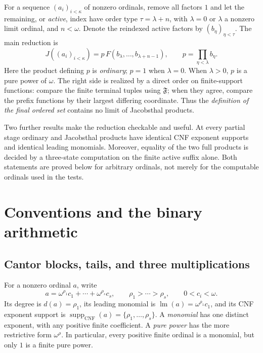 \documentclass[11pt,letterpaper]{article}
\theoremstyle{definition}
\theoremstyle{remark}
\newcommand{\FF}{\mathfrak F}
\newcommand{\CNF}{\operatorname{CNF}}
\newcommand{\supp}{\operatorname{supp}}
\newcommand{\lead}{\operatorname{lm}}
\begin{document}
For a sequence $(a_i)_{i<\kappa}$ of nonzero ordinals, remove all factors
$1$ and let the remaining, or \emph{active}, index have order type
$\tau=\lambda+n$, with $\lambda=0$ or $\lambda$ a nonzero limit ordinal,
and $n<\omega$. Denote the reindexed active factors by $(b_\eta)_{\eta<\tau}$.
The main reduction is
\begin{equation}\label{eq:intro-reduction}
 \boxed{\quad
 J((a_i)_{i<\kappa})
   =p\,F(b_\lambda,\ldots,b_{\lambda+n-1}),\qquad
 p=\prod_{\eta<\lambda}b_\eta .\quad}
\end{equation}
Here the product defining $p$ is \emph{ordinary}; $p=1$ when $\lambda=0$.
When $\lambda>0$, $p$ is a pure power of $\omega$.
The right side is realized by a direct order on finite-support functions:
compare the finite terminal tuples using $\FF$; when they agree, compare
the prefix functions by their largest differing coordinate. Thus the
\emph{definition of the final ordered set} contains no limit of Jacobsthal
products.

Two further results make the reduction checkable and useful. At every
partial stage ordinary and Jacobsthal products have identical CNF exponent
supports and identical leading monomials. Moreover, equality of the two
full products is decided by a three-state computation on the finite active
suffix alone. Both statements are proved below for arbitrary ordinals,
not merely for the computable ordinals used in the tests.

\section{Conventions and the binary arithmetic}\label{sec:background}

\subsection{Cantor blocks, tails, and three multiplications}

For a nonzero ordinal $a$, write
\begin{equation}\label{eq:cnf}
 a=\omega^{\rho_1}c_1+\cdots+\omega^{\rho_s}c_s,
 \qquad \rho_1>\cdots>\rho_s,\qquad 0<c_i<\omega.
\end{equation}
Its degree is $d(a)=\rho_1$, its leading monomial is
$\lead(a)=\omega^{\rho_1}c_1$, and its CNF exponent support is
$\supp_{\CNF}(a)=\{\rho_1,\ldots,\rho_s\}$.
A \emph{monomial} has one distinct exponent, with any positive finite
coefficient. A \emph{pure power} has the more restrictive form $\omega^\rho$.
In particular, every positive finite ordinal is a monomial, but only $1$
is a finite pure power.
\end{document}
